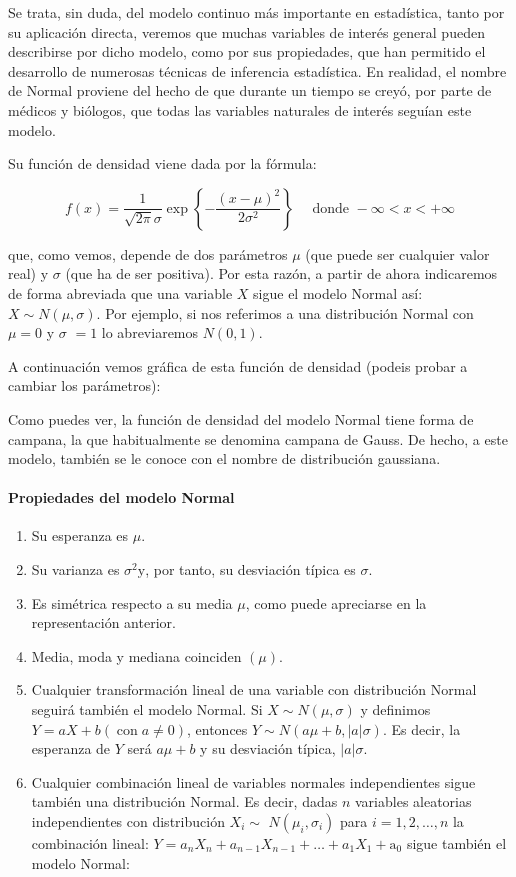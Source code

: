 \documentclass[
]{article}
\begin{document}
Se trata, sin duda, del modelo continuo más importante en estadística, tanto por su aplicación directa, veremos que muchas variables de interés general pueden describirse por dicho modelo, como por sus propiedades, que han permitido el desarrollo de numerosas técnicas de inferencia estadística. En realidad, el nombre de Normal proviene del hecho de que durante un tiempo se creyó, por parte de médicos y biólogos, que todas las variables naturales de interés seguían este modelo.

Su función de densidad viene dada por la fórmula:

\[
f(x)=\frac{1}{\sqrt{2 \pi} \sigma} \exp \left\{-\frac{(x-\mu)^{2}}{2 \sigma^{2}}\right\} \quad \text { donde }-\infty<x<+\infty
\]

que, como vemos, depende de dos parámetros \(\mu\) (que puede ser cualquier valor real) y \(\sigma\) (que ha de ser positiva). Por esta razón, a partir de ahora indicaremos de forma abreviada que una variable \(X\) sigue el modelo Normal así: \(X \sim N(\mu, \sigma)\). Por ejemplo, si nos referimos a una distribución Normal con \(\mu=0\) y \(\sigma\) \(=1\) lo abreviaremos \(N(0,1)\).

A continuación vemos gráfica de esta función de densidad (podeis probar a cambiar los parámetros):

Como puedes ver, la función de densidad del modelo Normal tiene forma de campana, la que habitualmente se denomina campana de Gauss. De hecho, a este modelo, también se le conoce con el nombre de distribución gaussiana.

\paragraph{Propiedades del modelo Normal}\label{propiedades-del-modelo-normal}

\begin{enumerate}
\def\labelenumi{\arabic{enumi}.}
\item
  Su esperanza es \(\mu\).
\item
  Su varianza es \(\sigma^{2} \mathrm{y}\), por tanto, su desviación típica es \(\sigma\).
\item
  Es simétrica respecto a su media \(\mu\), como puede apreciarse en la representación anterior.
\item
  Media, moda y mediana coinciden \((\mu)\).
\item
  Cualquier transformación lineal de una variable con distribución Normal seguirá también el modelo Normal. Si \(X \sim N(\mu, \sigma)\) y definimos \(Y=a X+b(\operatorname{con} a \neq 0)\), entonces \(Y \sim N(a \mu+b,|a| \sigma)\). Es decir, la esperanza de \(Y\) será \(a \mu+b\) y su desviación típica, \(|a| \sigma\).
\item
  Cualquier combinación lineal de variables normales independientes sigue también una distribución Normal. Es decir, dadas \(n\) variables aleatorias independientes con distribución \(X_{i} \sim\) \(N\left(\mu_{i}, \sigma_{i}\right)\) para \(i=1,2, \ldots, n\) la combinación lineal: \(Y=a_{n} X_{n}+a_{n-1} X_{n-1}+\ldots+a_{1} X_{1}+\mathrm{a}_{0}\) sigue también el modelo Normal:
\end{enumerate}
\end{document}
